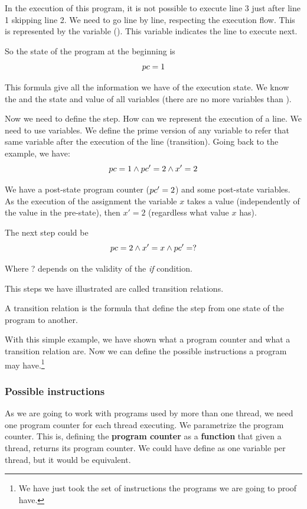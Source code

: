 In the execution of this program, it is not possible to execute line 3 just after line 1 skipping line 2. We need to go line by line, respecting the execution flow. 
This is represented by the variable \pc (). This variable indicates the line to execute next.

So the state of the program at the beginning is 
%
\[ pc = 1\]

This formula give all the information we have of the execution state. We know the \pc and the state and value of all variables (there are no more variables than \pc).

Now we need to define the step. 
%
How can we represent the execution of a line.
%
We need to use  variables. 
%
We define the prime version of any variable to refer that same variable after the execution of the line (transition). 
%
Going back to the example, we have:
%
\[
pc = 1 \wedge pc'=2 \wedge x'=2 
\]

We have a post-state program counter ($pc'=2$) and some post-state variables. 
%
As the execution of the assignment the variable $x$ takes a value (independently of the value in the pre-state), then $x'=2$ (regardless what value $x$ has). 

The next step could be
\[
pc = 2 \wedge x'=x \wedge 	pc'=?
\]

Where ? depends on the validity of the \textit{if} condition. 

This steps we have illustrated are called transition relations.

\begin{defn}
A transition relation is the formula that define the step from one state of the program to another.  
\end{defn}

With this simple example, we have shown what a program counter and what a transition relation are. Now we can define the possible instructions a program may have.\footnote{We have just took the set of instructions the programs we are going to proof have.}

\subsubsection{Possible instructions}
As we are going to work with programs used by more than one thread, we need one program counter for each thread executing. 
%
We parametrize the program counter. 
%
This is, defining the \textbf{program counter} as a \textbf{function} that given a thread, returns its program counter. 
%
We could have define as one variable per thread, but it would be equivalent. 


